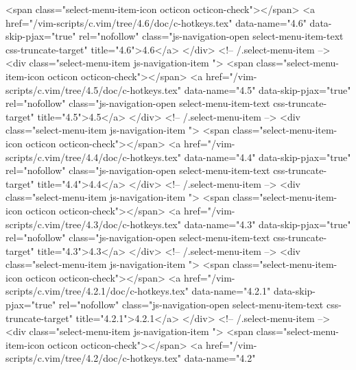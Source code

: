               <span class="select-menu-item-icon octicon octicon-check"></span>
              <a href="/vim-scripts/c.vim/tree/4.6/doc/c-hotkeys.tex"
                 data-name="4.6"
                 data-skip-pjax="true"
                 rel="nofollow"
                 class="js-navigation-open select-menu-item-text css-truncate-target"
                 title="4.6">4.6</a>
            </div> <!-- /.select-menu-item -->
            <div class="select-menu-item js-navigation-item ">
              <span class="select-menu-item-icon octicon octicon-check"></span>
              <a href="/vim-scripts/c.vim/tree/4.5/doc/c-hotkeys.tex"
                 data-name="4.5"
                 data-skip-pjax="true"
                 rel="nofollow"
                 class="js-navigation-open select-menu-item-text css-truncate-target"
                 title="4.5">4.5</a>
            </div> <!-- /.select-menu-item -->
            <div class="select-menu-item js-navigation-item ">
              <span class="select-menu-item-icon octicon octicon-check"></span>
              <a href="/vim-scripts/c.vim/tree/4.4/doc/c-hotkeys.tex"
                 data-name="4.4"
                 data-skip-pjax="true"
                 rel="nofollow"
                 class="js-navigation-open select-menu-item-text css-truncate-target"
                 title="4.4">4.4</a>
            </div> <!-- /.select-menu-item -->
            <div class="select-menu-item js-navigation-item ">
              <span class="select-menu-item-icon octicon octicon-check"></span>
              <a href="/vim-scripts/c.vim/tree/4.3/doc/c-hotkeys.tex"
                 data-name="4.3"
                 data-skip-pjax="true"
                 rel="nofollow"
                 class="js-navigation-open select-menu-item-text css-truncate-target"
                 title="4.3">4.3</a>
            </div> <!-- /.select-menu-item -->
            <div class="select-menu-item js-navigation-item ">
              <span class="select-menu-item-icon octicon octicon-check"></span>
              <a href="/vim-scripts/c.vim/tree/4.2.1/doc/c-hotkeys.tex"
                 data-name="4.2.1"
                 data-skip-pjax="true"
                 rel="nofollow"
                 class="js-navigation-open select-menu-item-text css-truncate-target"
                 title="4.2.1">4.2.1</a>
            </div> <!-- /.select-menu-item -->
            <div class="select-menu-item js-navigation-item ">
              <span class="select-menu-item-icon octicon octicon-check"></span>
              <a href="/vim-scripts/c.vim/tree/4.2/doc/c-hotkeys.tex"
                 data-name="4.2"
